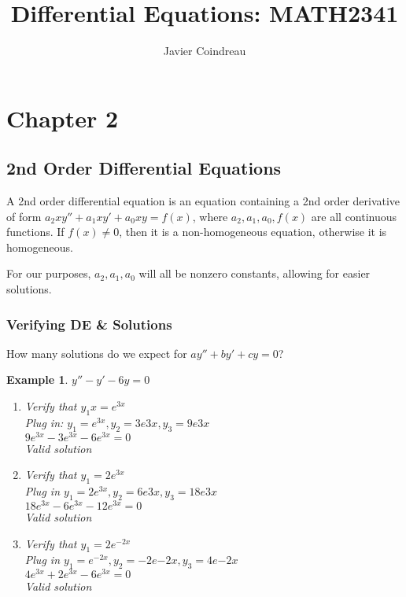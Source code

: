 \documentclass{article}
\title{Differential Equations: MATH2341}
\author{Javier Coindreau}
\newtheorem{example}{Example}
\begin{document}
\begin{titlepage}
	\maketitle
	\tableofcontents{}
\end{titlepage}


\section{Chapter 2}

\subsection{2nd Order Differential Equations}
A 2nd order differential equation is an equation containing a 2nd order derivative of form $a_2 x y'' + a_1 x y' + a_0 x y = f(x)$, where $a_2, a_1, a_0, f(x)$ are all continuous functions.
If $f(x) \neq 0$, then it is a non-homogeneous equation, otherwise it is homogeneous.

For our purposes, $a_2, a_1, a_0$ will all be nonzero constants, allowing for easier solutions.
\subsubsection{Verifying DE \& Solutions}
How many solutions do we expect for $ay''+by'+cy=0$?


\begin{example} $y''-y'-6y=0$
	\begin{enumerate}
		\item Verify that $y_1x=e^{3x}$
			\\ Plug in: $y_1=e^{3x}, y_2=3e{3x}, y_3=9e{3x}$
			\\ $9e^{3x}-3e^{3x}-6e^{3x}=0$
			\\ Valid solution
		\item Verify that $y_1=2e^{3x}$
			\\ Plug in $y_1=2e^{3x}, y_2=6e{3x}, y_3=18e{3x}$
			\\ $18e^{3x}-6e^{3x}-12e^{3x}=0$
			\\ Valid solution
		\item Verify that $y_1=2e^{-2x}$
			\\Plug in $y_1=e^{-2x}, y_2=-2e{-2x}, y_3=4e{-2x}$
			\\ $4e^{3x}+2e^{3x}-6e^{3x}=0$
			\\ Valid solution
	\end{enumerate}
\end{example}
\end{document}
